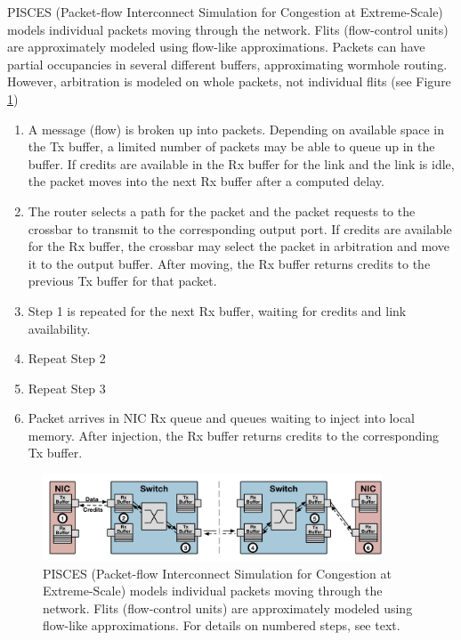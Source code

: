 PISCES (Packet-flow Interconnect Simulation for Congestion at Extreme-Scale) models individual packets moving through the network. Flits (flow-control units) are approximately modeled using flow-like approximations. Packets can have partial occupancies in several different buffers, approximating wormhole routing. However, arbitration is modeled on whole packets, not individual flits (see Figure \ref{fig:piscesOverview})
\begin{enumerate}
\item A message (flow) is broken up into packets. Depending on available space in the Tx buffer, a limited number of packets may be able to queue up in the buffer. If credits are available in the Rx buffer for the link and the link is idle, the packet moves into the next Rx buffer after a computed delay.
\item The router selects a path for the packet and the packet requests to the crossbar to transmit to the corresponding output port. If credits are available for the Rx buffer, the crossbar may select the packet in arbitration and move it to the output buffer. After moving, the Rx buffer returns credits to the previous Tx buffer for that packet.
\item Step 1 is repeated for the next Rx buffer, waiting for credits and link availability.
\item Repeat Step 2
\item Repeat Step 3
\item Packet arrives in NIC Rx queue and queues waiting to inject into local memory. After injection, the Rx buffer returns credits to the corresponding Tx buffer.
\end{enumerate}

\begin{figure}[h!]
\centering
\includegraphics[width=0.9\textwidth]{figures/pisces_overview.png}
\caption[PISCES model]{PISCES (Packet-flow Interconnect Simulation for Congestion at Extreme-Scale) models individual packets moving through the network. Flits (flow-control units) are approximately modeled using flow-like approximations. For details on numbered steps, see text.}
\label{fig:piscesOverview}
\end{figure}



